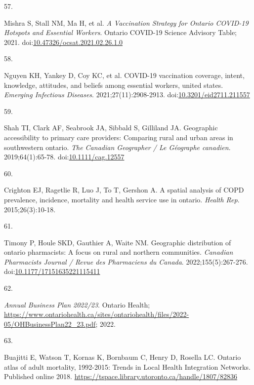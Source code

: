 \documentclass[
  letterpaper,
  DIV=11,
  numbers=noendperiod]{scrartcl}
\newlength{\cslhangindent}
\newlength{\csllabelwidth}
\newlength{\cslentryspacingunit} %
\newenvironment{CSLReferences}[2] %
 {%
  \setlength{\parindent}{0pt}
  \ifodd #1
  \let\oldpar\par
  \def\par{\hangindent=\cslhangindent\oldpar}
  \fi
  \setlength{\parskip}{#2\cslentryspacingunit}
 }%
 {}
\newcommand{\CSLLeftMargin}[1]{\parbox[t]{\csllabelwidth}{#1}}
\newcommand{\CSLRightInline}[1]{\parbox[t]{\linewidth - \csllabelwidth}{#1}\break}
\begin{document}
\begin{CSLReferences}{0}{0}
\leavevmode{}%
\CSLLeftMargin{57. }%
\CSLRightInline{Mishra S, Stall NM, Ma H, et al. \emph{A Vaccination
Strategy for Ontario {COVID}-19 Hotspots and Essential Workers}. Ontario
{COVID}-19 Science Advisory Table; 2021.
doi:\href{https://doi.org/10.47326/ocsat.2021.02.26.1.0}{10.47326/ocsat.2021.02.26.1.0}}

\leavevmode{}%
\CSLLeftMargin{58. }%
\CSLRightInline{Nguyen KH, Yankey D, Coy KC, et al. {COVID}-19
vaccination coverage, intent, knowledge, attitudes, and beliefs among
essential workers, united states. \emph{Emerging Infectious Diseases}.
2021;27(11):2908-2913.
doi:\href{https://doi.org/10.3201/eid2711.211557}{10.3201/eid2711.211557}}

\leavevmode{}%
\CSLLeftMargin{59. }%
\CSLRightInline{Shah TI, Clark AF, Seabrook JA, Sibbald S, Gilliland JA.
Geographic accessibility to primary care providers: Comparing rural and
urban areas in southwestern ontario. \emph{The Canadian Geographer / Le
G{é}ographe canadien}. 2019;64(1):65-78.
doi:\href{https://doi.org/10.1111/cag.12557}{10.1111/cag.12557}}

\leavevmode{}%
\CSLLeftMargin{60. }%
\CSLRightInline{Crighton EJ, Ragetlie R, Luo J, To T, Gershon A. A
spatial analysis of {COPD} prevalence, incidence, mortality and health
service use in ontario. \emph{Health Rep}. 2015;26(3):10-18.}

\leavevmode{}%
\CSLLeftMargin{61. }%
\CSLRightInline{Timony P, Houle SKD, Gauthier A, Waite NM. Geographic
distribution of ontario pharmacists: A focus on rural and northern
communities. \emph{Canadian Pharmacists Journal / Revue des Pharmaciens
du Canada}. 2022;155(5):267-276.
doi:\href{https://doi.org/10.1177/17151635221115411}{10.1177/17151635221115411}}

\leavevmode{}%
\CSLLeftMargin{62. }%
\CSLRightInline{\emph{{A}nnual {B}usiness {P}lan 2022/23}. Ontario
Health;
\url{https://www.ontariohealth.ca/sites/ontariohealth/files/2022-05/OHBusinessPlan22_23.pdf};
2022.}

\leavevmode{}%
\CSLLeftMargin{63. }%
\CSLRightInline{Buajitti E, Watson T, Kornas K, Bornbaum C, Henry D,
Rosella LC. Ontario atlas of adult mortality, 1992-2015: Trends in
{L}ocal {H}ealth {I}ntegration {N}etworks. Published online 2018.
\url{https://tspace.library.utoronto.ca/handle/1807/82836}}


\end{CSLReferences}
\end{document}
